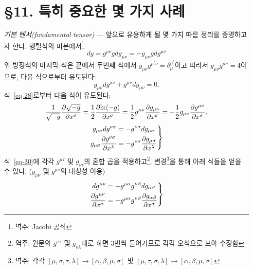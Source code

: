 \section*{\S 11. 특히 중요한 몇 가지 사례}
\emph{기본 텐서(fundamental tensor)} --- 앞으로 유용하게 될 몇 가지 따름 정리를 증명하고자 한다. 행렬식의 미분에서\footnote{역주: Jacobi 공식}
\begin{equation} \label{eq-28}
	dg = g^{\mu\nu} g dg_{\mu\nu} = -g_{\mu\nu} g dg^{\mu\nu}
\end{equation}
위 방정식의 마지막 식은 끝에서 두번째 식에서 $g_{\mu\nu} g^{\mu^\prime \nu} = \delta_\mu^{\mu^\prime}$이고 따라서 $g_{\mu\nu} g^{\mu\nu} = 4$이므로, 다음 식으로부터 유도된다:
\begin{equation*}
	g_{\mu\nu} dg^{\mu\nu} + g^{\mu\nu} dg_{\mu\nu} = 0.
\end{equation*}
식~\eqref{eq-28}로부터 다음 식이 유도된다:
\begin{equation} \label{eq-29}
	\dfrac{1}{\sqrt{-g}}{\frac{{\partial}{\sqrt{-g}}}{{\partial}{x^\sigma}}}
	= \dfrac{1}{2} {\frac{{\partial}{\ln(-g)}}{{\partial}{x^\sigma}}}
	= \dfrac{1}{2} g^{\mu\nu} {\frac{{\partial}{g_{\mu\nu}}}{{\partial}{x^\sigma}}}
	= -\dfrac{1}{2} g_{\mu\nu} {\frac{{\partial}{g^{\mu\nu}}}{{\partial}{x^\sigma}}}.
\end{equation}
\begin{equation} \label{eq-30}
	\left.
	\begin{aligned}
		g_{\mu\sigma} dg^{\nu\sigma}&=-g^{\nu\sigma} dg_{\mu\sigma} \\
		g_{\mu\sigma} {\frac{{\partial}{g^{\nu\sigma}}}{{\partial}{x^\lambda}}}
		&= -g^{\nu\sigma} {\frac{{\partial}{g_{\mu\sigma}}}{{\partial}{x^\lambda}}}
	\end{aligned}
	\right\}
\end{equation}
식~\eqref{eq-30}에 각각 $g^{\mu\tau}$ 및 $g_{\nu\tau}$의 혼합 곱을 적용하고\footnote{역주: 원문의 $g^{\sigma\tau}$ 및 $g_{\nu\lambda}$대로 하면 \Index\이 3번씩 들어가므로 각각 오식으로 보아 수정함},  변경\footnote{역주: 각각 $ \left[\mu, \sigma, \tau, \lambda\right]\rightarrow \left[\alpha, \beta, \mu, \sigma\right] $ 및 $ \left[\mu, \tau, \sigma, \lambda\right]\rightarrow \left[\alpha, \beta, \mu, \sigma\right] $}을 통해 아래 식들을 얻을 수 있다. ($g_{\mu\nu}$ 및 $g^{\mu\nu}$의 대칭성 이용)
\begin{equation} \label{eq-31}
	\left.
	\begin{aligned}
		dg^{\mu\nu}&=- g^{\mu\alpha} g^{\nu\beta}dg_{\alpha\beta} \\
		{\frac{{\partial}{g^{\mu\nu}}}{{\partial}{x^\sigma}}}
		&= - g^{\mu\alpha} g^{\nu\beta} {\frac{{\partial}{g_{\alpha\beta}}}{{\partial}{x^\sigma}}} 
	\end{aligned}
	\right\}
\end{equation}
